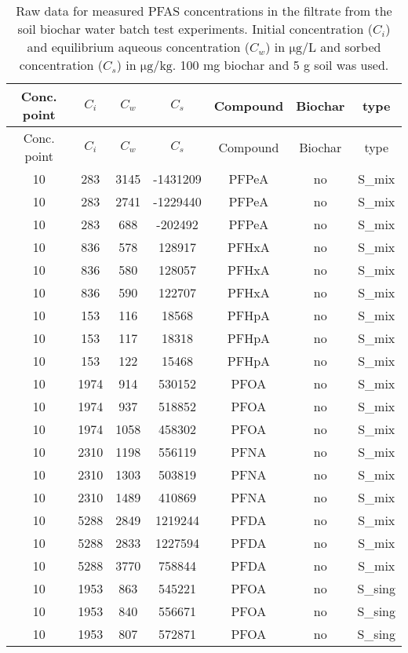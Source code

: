 \begin{longtable}[c]{ccccccc}
\caption{Raw data for measured PFAS concentrations in the filtrate from the soil biochar water batch test experiments. Initial concentration ($C_i$) and equilibrium aqueous concentration ($C_w$) in $\mathrm{\mu g/L}$ and sorbed concentration ($C_s$) in $\mathrm{\mu g/kg}$. 100 mg biochar and 5 g soil was used. \label{apptab:BC_soil_batchtests}} \\
\toprule
Conc. point & $C_i$ & $C_w$ & $C_s$ & Compound & Biochar & type \\ \midrule \endfirsthead \toprule
Conc. point & $C_i$ & $C_w$ & $C_s$ & Compound & Biochar & type \\ \midrule \endhead
10 & 283 & 3145 & -1431209 & PFPeA & no & S\_mix \\
10 & 283 & 2741 & -1229440 & PFPeA & no & S\_mix \\
10 & 283 & 688 & -202492 & PFPeA & no & S\_mix \\
10 & 836 & 578 & 128917 & PFHxA & no & S\_mix \\
10 & 836 & 580 & 128057 & PFHxA & no & S\_mix \\
10 & 836 & 590 & 122707 & PFHxA & no & S\_mix \\
10 & 153 & 116 & 18568 & PFHpA & no & S\_mix \\
10 & 153 & 117 & 18318 & PFHpA & no & S\_mix \\
10 & 153 & 122 & 15468 & PFHpA & no & S\_mix \\
10 & 1974 & 914 & 530152 & PFOA & no & S\_mix \\
10 & 1974 & 937 & 518852 & PFOA & no & S\_mix \\
10 & 1974 & 1058 & 458302 & PFOA & no & S\_mix \\
10 & 2310 & 1198 & 556119 & PFNA & no & S\_mix \\
10 & 2310 & 1303 & 503819 & PFNA & no & S\_mix \\
10 & 2310 & 1489 & 410869 & PFNA & no & S\_mix \\
10 & 5288 & 2849 & 1219244 & PFDA & no & S\_mix \\
10 & 5288 & 2833 & 1227594 & PFDA & no & S\_mix \\
10 & 5288 & 3770 & 758844 & PFDA & no & S\_mix \\
10 & 1953 & 863 & 545221 & PFOA & no & S\_sing \\
10 & 1953 & 840 & 556671 & PFOA & no & S\_sing \\
10 & 1953 & 807 & 572871 & PFOA & no & S\_sing \\

\end{longtable}
